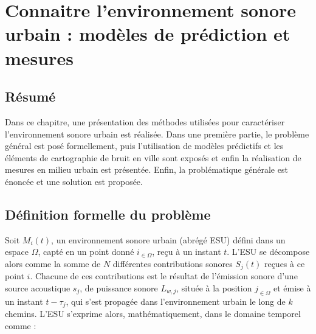 \chapter{Connaitre l'environnement sonore urbain : modèles de prédiction et mesures}\label{chap:modele}
\thispagestyle{empty}

\section*{\centering Résumé}



\vspace{2cm}

Dans ce chapitre, une présentation des méthodes utilisées pour caractériser l'environnement sonore urbain est réalisée. Dans une première partie, le problème général est posé formellement, puis l'utilisation de modèles prédictifs et les éléments de cartographie de bruit en ville sont exposés et enfin la réalisation de mesures en milieu urbain est présentée. Enfin, la problématique générale est énoncée et une solution est proposée.

\section{Définition formelle du problème}

Soit $M_{i}(t)$, un environnement sonore urbain (abrégé ESU) défini dans un espace $\Omega$, capté en un point donné $i_{\in \Omega}$, reçu à un instant $t$. L'ESU se décompose alors comme la somme de $N$ différentes contributions sonores $S_j(t)$ reçues à ce point $i$. Chacune de ces contributions est le résultat de l'émission sonore d'une source acoustique $s_j$, de puissance sonore $L_{w,j}$, située à la position $j_{\in \Omega}$ et émise à un instant $t-\tau_j$,  qui s'est propagée dans l'environnement urbain le long de $k$ chemins. L'ESU s'exprime alors, mathématiquement, dans le domaine temporel comme :

